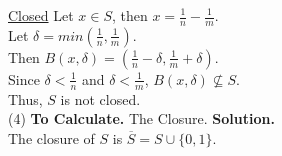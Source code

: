 \documentclass[11pt]{article}
\begin{document}
\noindent \underline{Closed} Let $x \in S$, then $x = \frac{1}{n} - \frac{1}{m}$.\\
Let $\delta = min(\frac{1}{n}, \frac{1}{m})$.\\
Then $B(x, \delta) = (\frac{1}{n} - \delta, \frac{1}{m} + \delta)$.\\
Since $\delta < \frac{1}{n}$ and $\delta < \frac{1}{m}$, $B(x, \delta) \not\subseteq S$.\\
Thus, $S$ is not closed.\\

(4) \textbf{To Calculate. } The Closure.
\textbf{Solution.} \\
The closure of $S$ is $\overline{S} = S \cup \{0, 1\}$.\\
\end{document}
